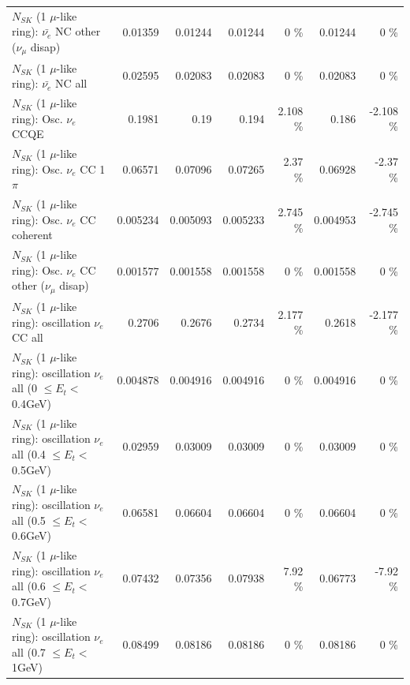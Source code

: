 \begin{table}
\begin{tabular}{| l | r | r | r  r | r  r |}
          $N_{SK}$ (1 $\mu$-like ring): $\bar{\nu_e}$ NC other ($\nu_\mu$ disap) &         0.01359 &         0.01244 &         0.01244 &        0 \%  &         0.01244 &        0 \%  \\ 
                            $N_{SK}$ (1 $\mu$-like ring): $\bar{\nu_{e}}$ NC all &         0.02595 &         0.02083 &         0.02083 &        0 \%  &         0.02083 &        0 \%  \\ 
\hline
\hline
\hline
                                 $N_{SK}$ (1 $\mu$-like ring): Osc. $\nu_e$ CCQE &          0.1981 &            0.19 &           0.194 &    2.108 \%  &           0.186 &   -2.108 \%  \\ 
                            $N_{SK}$ (1 $\mu$-like ring): Osc. $\nu_e$ CC 1$\pi$ &         0.06571 &         0.07096 &         0.07265 &     2.37 \%  &         0.06928 &    -2.37 \%  \\ 
                          $N_{SK}$ (1 $\mu$-like ring): Osc. $\nu_e$ CC coherent &        0.005234 &        0.005093 &        0.005233 &    2.745 \%  &        0.004953 &   -2.745 \%  \\ 
           $N_{SK}$ (1 $\mu$-like ring): Osc. $\nu_e$ CC other ($\nu_\mu$ disap) &        0.001577 &        0.001558 &        0.001558 &        0 \%  &        0.001558 &        0 \%  \\ 
                        $N_{SK}$ (1 $\mu$-like ring): oscillation $\nu_e$ CC all &          0.2706 &          0.2676 &          0.2734 &    2.177 \%  &          0.2618 &   -2.177 \%  \\ 
\hline
$N_{SK}$ (1 $\mu$-like ring): oscillation $\nu_{e}$ all (0 $\leq E_{t} <$ 0.4GeV) &        0.004878 &        0.004916 &        0.004916 &        0 \%  &        0.004916 &        0 \%  \\ 
$N_{SK}$ (1 $\mu$-like ring): oscillation $\nu_{e}$ all (0.4 $\leq E_{t} <$ 0.5GeV) &         0.02959 &         0.03009 &         0.03009 &        0 \%  &         0.03009 &        0 \%  \\ 
$N_{SK}$ (1 $\mu$-like ring): oscillation $\nu_{e}$ all (0.5 $\leq E_{t} <$ 0.6GeV) &         0.06581 &         0.06604 &         0.06604 &        0 \%  &         0.06604 &        0 \%  \\ 
$N_{SK}$ (1 $\mu$-like ring): oscillation $\nu_{e}$ all (0.6 $\leq E_{t} <$ 0.7GeV) &         0.07432 &         0.07356 &         0.07938 &     7.92 \%  &         0.06773 &    -7.92 \%  \\ 
$N_{SK}$ (1 $\mu$-like ring): oscillation $\nu_{e}$ all (0.7 $\leq E_{t} <$ 1GeV) &         0.08499 &         0.08186 &         0.08186 &        0 \%  &         0.08186 &        0 \%  \\ 

\end{tabular}
\end{table}
